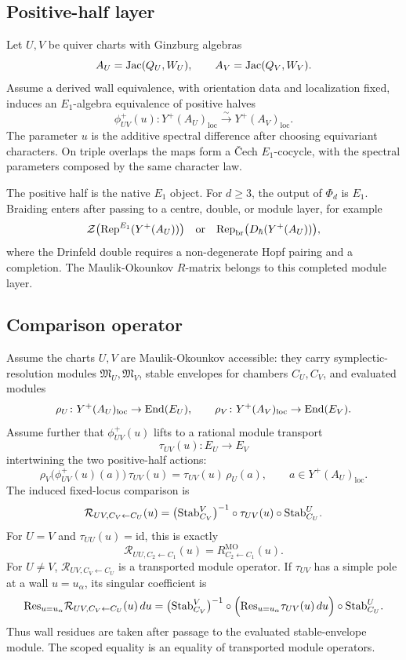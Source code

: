 \subsection*{Positive-half layer}

Let \(U,V\) be quiver charts with Ginzburg algebras
\[
  A_U=\mathrm{Jac}(Q_U,W_U),
  \qquad
  A_V=\mathrm{Jac}(Q_V,W_V).
\]
Assume a derived wall equivalence, with orientation data and
localization fixed, induces an \(E_1\)-algebra equivalence of positive
halves
\[
  \phi^+_{UV}(u)\colon
  Y^+(A_U)_{\mathrm{loc}}
  \xrightarrow{\ \sim\ }
  Y^+(A_V)_{\mathrm{loc}}.
\]
The parameter \(u\) is the additive spectral difference after choosing
equivariant characters. On triple overlaps the maps form a
\v{C}ech \(E_1\)-cocycle, with the spectral parameters composed by the
same character law.

The positive half is the native \(E_1\) object. For \(d\geq3\), the
output of \(\Phi_d\) is \(E_1\). Braiding enters after passing to a
centre, double, or module layer, for example
\[
  \mathcal Z\bigl(\mathrm{Rep}^{E_1}(Y^+(A_U))\bigr)
  \quad\text{or}\quad
  \mathrm{Rep}_{\mathrm{br}}\bigl(D_{\hbar}(Y^+(A_U))\bigr),
\]
where the Drinfeld double requires a non-degenerate Hopf pairing and a
completion. The Maulik-Okounkov \(R\)-matrix belongs to this completed
module layer.

\subsection*{Comparison operator}

Assume the charts \(U,V\) are Maulik-Okounkov accessible: they carry
symplectic-resolution modules \(\mathfrak M_U,\mathfrak M_V\), stable
envelopes for chambers \(C_U,C_V\), and evaluated modules
\[
  \rho_U\colon Y^+(A_U)_{\mathrm{loc}}\to\mathrm{End}(E_U),
  \qquad
  \rho_V\colon Y^+(A_V)_{\mathrm{loc}}\to\mathrm{End}(E_V).
\]
Assume further that \(\phi^+_{UV}(u)\) lifts to a rational module
transport
\[
  \tau_{UV}(u)\colon E_U\longrightarrow E_V
\]
intertwining the two positive-half actions:
\[
  \rho_V\bigl(\phi^+_{UV}(u)(a)\bigr)\,\tau_{UV}(u)
  =
  \tau_{UV}(u)\,\rho_U(a),
  \qquad
  a\in Y^+(A_U)_{\mathrm{loc}}.
\]
The induced fixed-locus comparison is
\[
  \mathcal R_{UV,C_V\leftarrow C_U}(u)
  =
  \bigl(\mathrm{Stab}^V_{C_V}\bigr)^{-1}
  \circ \tau_{UV}(u)\circ
  \mathrm{Stab}^U_{C_U}.
\]
For \(U=V\) and \(\tau_{UU}(u)=\mathrm{id}\), this is exactly
\[
  \mathcal R_{UU,C_2\leftarrow C_1}(u)
  =
  R^{\mathrm{MO}}_{C_2\leftarrow C_1}(u).
\]
For \(U\neq V\), \(\mathcal R_{UV,C_V\leftarrow C_U}\) is a transported
module operator. If \(\tau_{UV}\) has a simple pole at a wall
\(u=u_{\alpha}\), its singular coefficient is
\[
  \mathrm{Res}_{u=u_\alpha}\mathcal R_{UV,C_V\leftarrow C_U}(u)\,du
  =
  \bigl(\mathrm{Stab}^V_{C_V}\bigr)^{-1}
  \circ
  \Bigl(\mathrm{Res}_{u=u_\alpha}\tau_{UV}(u)\,du\Bigr)
  \circ
  \mathrm{Stab}^U_{C_U}.
\]
Thus wall residues are taken after passage to the evaluated
stable-envelope module. The scoped equality is an equality of transported
module operators.

